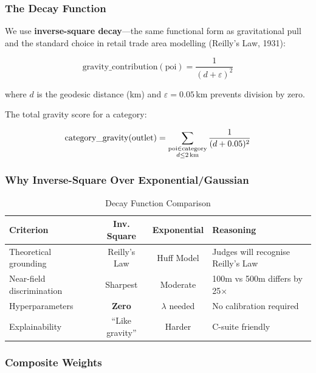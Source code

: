 \documentclass[10.75pt, a4paper]{article}
\begin{document}
\subsubsection{The Decay Function}

We use \textbf{inverse-square decay}---the same functional form as gravitational pull and the standard choice in retail trade area modelling (Reilly's Law, 1931):

\begin{equation}
\text{gravity\_contribution}(\text{poi}) = \frac{1}{(d + \varepsilon)^2}
\label{eq:gravity}
\end{equation}

\noindent where $d$ is the geodesic distance (km) and $\varepsilon = 0.05$\,km prevents division by zero.

\noindent The total gravity score for a category:

\begin{equation}
\text{category\_gravity}(\text{outlet}) = \sum_{\substack{\text{poi} \in \text{category} \\ d \leq 2\text{\,km}}} \frac{1}{(d + 0.05)^2}
\end{equation}

\subsubsection{Why Inverse-Square Over Exponential/Gaussian}

\begin{table}[H]
\centering
\caption{Decay Function Comparison}
\begin{tabularx}{\textwidth}{lccX}
\toprule
\textbf{Criterion} & \textbf{Inv. Square} & \textbf{Exponential} & \textbf{Reasoning} \\
\midrule
Theoretical grounding & Reilly's Law & Huff Model & Judges will recognise Reilly's Law \\
Near-field discrimination & Sharpest & Moderate & 100m vs 500m differs by 25$\times$ \\
Hyperparameters & \textbf{Zero} & $\lambda$ needed & No calibration required \\
Explainability & ``Like gravity'' & Harder & C-suite friendly \\
\bottomrule
\end{tabularx}
\end{table}

\subsubsection{Composite Weights}
\end{document}
